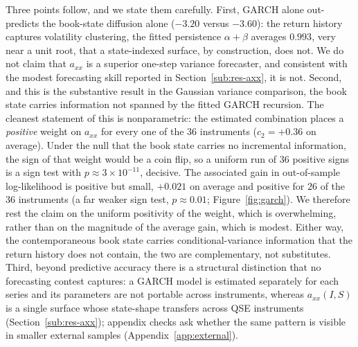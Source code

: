 \documentclass[11pt]{article}
\theoremstyle{plain}
\theoremstyle{definition}
\newcommand{\axx}{a_{xx}}
\begin{document}
\FloatBarrier

Three points follow, and we state them carefully. First, GARCH alone out-predicts the
book-state diffusion alone ($-3.20$ versus $-3.60$): the return history captures
volatility clustering, the fitted persistence $\alpha+\beta$ averages $0.993$, very
near a unit root, that a state-indexed surface, by construction, does not. We do not
claim that $\axx$ is a superior one-step variance forecaster, and consistent with the
modest forecasting skill reported in Section~\ref{sub:res-axx}, it is not. Second, and
this is the substantive result in the Gaussian variance comparison, the book state carries
information not spanned by the fitted GARCH recursion. The cleanest statement of this is
nonparametric: the estimated combination
places a \emph{positive} weight on $\axx$ for every one of the $36$ instruments
($c_2=+0.36$ on average). Under the null that the book state carries no incremental
information, the sign of that weight would be a coin flip, so a uniform run of $36$
positive signs is a sign test with $p\approx3\times10^{-11}$, decisive. The associated
gain in out-of-sample log-likelihood is positive but small, $+0.021$ on average and
positive for $26$ of the $36$ instruments (a far weaker sign test, $p\approx0.01$;
Figure~\ref{fig:garch}). We
therefore rest the claim on the uniform positivity of the weight, which is
overwhelming, rather than on the magnitude of the average gain, which is modest. Either
way, the contemporaneous book state carries conditional-variance information that the
return history does not contain, the two are complementary, not substitutes. Third,
beyond predictive accuracy there is a structural distinction that no forecasting
contest captures: a GARCH model is estimated separately for each series and its
parameters are not portable across instruments, whereas $\axx(I,S)$ is a single surface
whose state-shape transfers across QSE instruments (Section~\ref{sub:res-axx}); appendix
checks ask whether the same pattern is visible in smaller external samples
(Appendix~\ref{app:external}).
\end{document}
